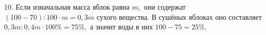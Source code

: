 10. Если изначальная масса яблок равна $m,$ они содержат $(100-70):100\cdot m=0,3m$ сухого вещества. В сушёных яблоках оно составляет $0,3m:0,4m\cdot100\%=75\%,$ а значит воды в них $100-75=25\%.$\\

